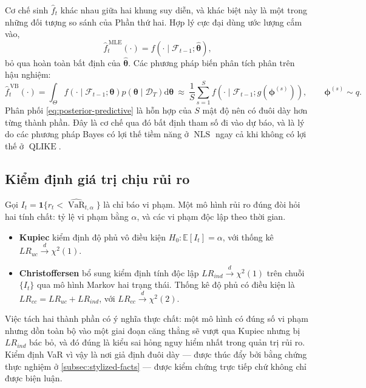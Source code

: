\documentclass[12pt,a4paper]{article}
\numberwithin{equation}{section}
\theoremstyle{definition}
\newcommand{\E}{\mathbb{E}}
\newcommand{\QLIKE}{\operatorname{QLIKE}}
\newcommand{\NLS}{\operatorname{NLS}}
\newcommand{\VaR}{\operatorname{VaR}}
\newcommand{\Data}{\mathcal{D}}
\newcommand{\Info}{\mathcal{F}}
\newcommand{\Param}{\symbf{\theta}}
\newcommand{\vecphi}{\symbf{\phi}}
\newcommand{\diff}{\mathrm{d}}
\begin{document}
Cơ chế sinh $\widehat f_t$ khác nhau giữa hai khung suy diễn, và khác biệt này là một
trong những đối tượng so sánh của Phần thứ hai. Hợp lý cực đại dùng ước lượng cắm vào,
\begin{equation}
  \widehat f_t^{\,\mathrm{MLE}}(\cdot)=f\!\left(\cdot\mid\Info_{t-1};\hat{\Param}\right),
  \label{eq:plugin-predictive}
\end{equation}
bỏ qua hoàn toàn bất định của $\hat{\Param}$. Các phương pháp biến phân tích phân trên
hậu nghiệm:
\begin{equation}
  \widehat f_t^{\,\mathrm{VB}}(\cdot)
  =\int_{\Theta}f\!\left(\cdot\mid\Info_{t-1};\Param\right)
  p\!\left(\Param\mid\Data_T\right)\diff\Param
  \ \approx\ \frac{1}{S}\sum_{s=1}^{S}
  f\!\left(\cdot\mid\Info_{t-1};g(\vecphi^{(s)})\right),
  \qquad \vecphi^{(s)}\sim q.
  \label{eq:posterior-predictive}
\end{equation}
Phân phối \eqref{eq:posterior-predictive} là hỗn hợp của $S$ mật độ nên có đuôi dày hơn
từng thành phần. Đây là cơ chế qua đó bất định tham số đi vào dự báo, và là lý do các
phương pháp Bayes có lợi thế tiềm năng ở $\NLS$ ngay cả khi không có lợi thế ở $\QLIKE$.

\subsection{Kiểm định giá trị chịu rủi ro}\label{subsec:var-tests}
Gọi $I_t=\symbf 1\{r_t<\widehat{\VaR}_{t,\alpha}\}$ là chỉ báo vi phạm. Một mô hình rủi
ro đúng đòi hỏi hai tính chất: tỷ lệ vi phạm bằng $\alpha$, và các vi phạm độc lập theo
thời gian.
\begin{itemize}
  \item \textbf{Kupiec} \cite{kupiec1995} kiểm định độ phủ vô điều kiện
  $H_0\!:\E[I_t]=\alpha$, với thống kê $LR_{uc}\overset{d}{\to}\chi^{2}(1)$.
  \item \textbf{Christoffersen} \cite{christoffersen1998} bổ sung kiểm định tính độc lập
  $LR_{ind}\overset{d}{\to}\chi^{2}(1)$ trên chuỗi $\{I_t\}$ qua mô hình Markov hai trạng
  thái. Thống kê độ phủ có điều kiện là $LR_{cc}=LR_{uc}+LR_{ind}$, với
  $LR_{cc}\overset{d}{\to}\chi^{2}(2)$.
\end{itemize}
Việc tách hai thành phần có ý nghĩa thực chất: một mô hình có đúng số vi phạm nhưng dồn
toàn bộ vào một giai đoạn căng thẳng sẽ vượt qua Kupiec nhưng bị $LR_{ind}$ bác bỏ, và đó
đúng là kiểu sai hỏng nguy hiểm nhất trong quản trị rủi ro. Kiểm định VaR vì vậy là nơi
giả định đuôi dày --- được thúc đẩy bởi bằng chứng thực nghiệm ở
\cref{subsec:stylized-facts} --- được kiểm chứng trực tiếp chứ không chỉ được biện luận.
\end{document}

